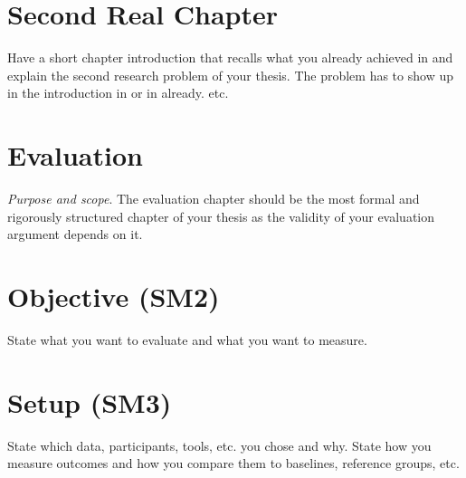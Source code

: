 \section{Second Real Chapter}\label{sec:sub-problem2}

Have a short chapter introduction that recalls what you already achieved in  and explain the second research problem of your thesis.
The problem has to show up in the introduction in  or in  already.
etc.

\section{Evaluation}\label{sec:evaluation}

\emph{Purpose and scope}.
The evaluation chapter should be the most formal and rigorously structured chapter of your thesis as the validity of your evaluation argument depends on it.

\section{Objective (SM2)}\label{sec:evaluation:objective}

State what you want to evaluate and what you want to measure.

\section{Setup (SM3)}\label{sec:evaluation:setup}

State which data, participants, tools, etc. you chose and why.
State how you measure outcomes and how you compare them to baselines, reference groups, etc.

